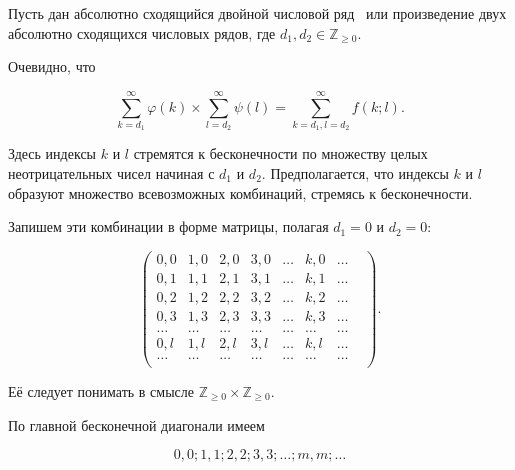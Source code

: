 \smallskip




Пусть дан абсолютно сходящийся двойной числовой ряд~\cite{korneev:1} или произведение двух абсолютно сходящихся числовых рядов, где $d_1, d_2\in\mathbb{Z}_{\ge 0}$. 

Очевидно, что

$$\sum_{k=d_1}^\infty \varphi (k)\times

\sum_{l=d_2}^\infty \psi (l)=

\sum_{k=d_1,l=d_2}^\infty f(k;l).$$

Здесь индексы $k$ и $l$ стремятся к бесконечности по множеству целых неотрицательных чисел начиная с $d_1$   и $d_2$. Предполагается, что индексы $k$ и $l$ образуют множество всевозможных комбинаций, стремясь к бесконечности.



Запишем эти комбинации в форме матрицы, полагая $d_1=0$ и $d_2=0$:

$$\begin{pmatrix}

{0}, {0}&{1}, {0}&{2}, {0}&{3}, {0}&\ldots &{k}, {0}&\ldots\\

{0}, {1}&{1}, {1}&{2}, {1}&{3}, {1}&\ldots &{k}, {1}&\ldots\\

{0}, {2}&{1}, {2}&{2}, {2}&{3}, {2}&\ldots &{k}, {2}&\ldots\\

{0}, {3}&{1}, {3}&{2}, {3}&{3}, {3}&\ldots &{k}, {3}&\ldots\\

\ldots &\ldots &\ldots &\ldots &\ldots &\ldots &\ldots &\\

{0}, {l}&{1}, {l}&{2}, {l}&{3}, {l}&\ldots &{k}, {l}&\ldots\\

\ldots &\ldots &\ldots &\ldots &\ldots &\ldots &\ldots &\\

\end{pmatrix}.$$

Её следует понимать в смысле $\mathbb{Z}_{\ge 0}\times \mathbb{Z}_{\ge 0}$.



По главной бесконечной диагонали имеем

$$0, 0; 1, 1; 2, 2; 3, 3;  \ldots; m, m;\dots$$

